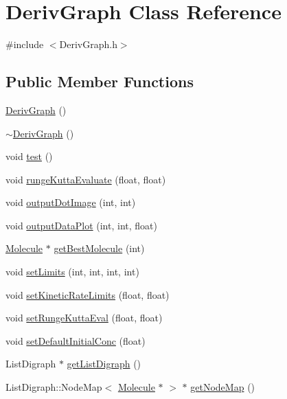 \hypertarget{classDerivGraph}{
\section{DerivGraph Class Reference}
\label{classDerivGraph}
}


{\ttfamily \#include $<$DerivGraph.h$>$}\subsection*{Public Member Functions}
\begin{DoxyCompactItemize}
\item 
\hyperlink{classDerivGraph_af2a1f80b96b4657e7575748942d09947}{DerivGraph} ()
\item 
\hyperlink{classDerivGraph_a27b4fed56f8d2a745582622b7cb78b50}{$\sim$DerivGraph} ()
\item 
void \hyperlink{classDerivGraph_abf589f6aabe2c66bbe6f1aeb68ff4593}{test} ()
\item 
void \hyperlink{classDerivGraph_aa0921b8a7407be67085e9a11750a7263}{rungeKuttaEvaluate} (float, float)
\item 
void \hyperlink{classDerivGraph_a2e2ed79e21c6896a859cc7800d950809}{outputDotImage} (int, int)
\item 
void \hyperlink{classDerivGraph_ae435e564c1fa8370453c952b1ea5e9ab}{outputDataPlot} (int, int, float)
\item 
\hyperlink{classMolecule}{Molecule} $\ast$ \hyperlink{classDerivGraph_aaaa9598e55cbd8c55585a0488e940516}{getBestMolecule} (int)
\item 
void \hyperlink{classDerivGraph_a9bec1192a5ffc41a3ef4527caa9cdb8f}{setLimits} (int, int, int, int)
\item 
void \hyperlink{classDerivGraph_a79249de71c4c870277abed71d484e2d5}{setKineticRateLimits} (float, float)
\item 
void \hyperlink{classDerivGraph_a03b18e0508b383e7e6b3b57fc9fa6e90}{setRungeKuttaEval} (float, float)
\item 
void \hyperlink{classDerivGraph_ab0a014cac7227943fe67f85f52d4e613}{setDefaultInitialConc} (float)
\item 
ListDigraph $\ast$ \hyperlink{classDerivGraph_ae657edb3b0bf358f75f498a2d56e0456}{getListDigraph} ()
\item 
ListDigraph::NodeMap$<$ \hyperlink{classMolecule}{Molecule} $\ast$ $>$ $\ast$ \hyperlink{classDerivGraph_a41cea20de6fd631deeb82f036bc823f4}{getNodeMap} ()
\item 

\end{DoxyCompactItemize}
